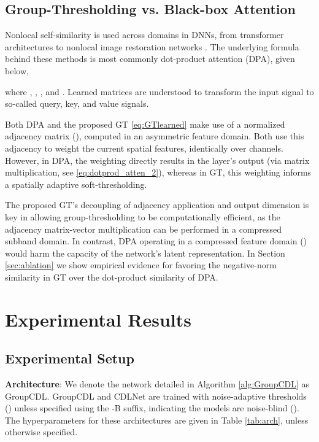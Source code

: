 \documentclass[lettersize,journal]{IEEEtran}
\begin{document}
\subsection{Group-Thresholding vs. Black-box Attention}
Nonlocal self-similarity is used across domains in DNNs, from transformer
architectures \cite{dao2022flashattention} to nonlocal image restoration networks
\cite{liu2018non, zhang2019residual}. The underlying formula behind these methods is most commonly dot-product attention (DPA), given below,

where , ,
, and . 
Learned matrices  are understood to transform the input signal
 to so-called query, key, and value signals. 

Both DPA and the proposed GT \eqref{eq:GTlearned} make use of a normalized adjacency matrix
(), computed in an asymmetric feature domain. Both use this adjacency
to weight the current spatial features, identically over channels. However, in
DPA, the weighting directly results in the layer's output (via matrix
multiplication, see \eqref{eq:dotprod_atten_2}), whereas in GT, this weighting informs a spatially adaptive
soft-thresholding. 

The proposed GT's decoupling of adjacency application and output dimension is key in allowing
group-thresholding to be computationally efficient, as the adjacency
matrix-vector multiplication can be performed in a compressed subband domain. In contrast,
DPA operating in a compressed feature domain () would harm the
capacity of the network's latent representation. In Section
\ref{sec:ablation} we show empirical evidence for favoring the negative-norm
similarity in GT over the dot-product similarity of DPA.

\section{Experimental Results} \label{sec:results}
\subsection{Experimental Setup}
\textbf{Architecture}: We denote the network detailed in Algorithm \ref{alg:GroupCDL} as
GroupCDL. GroupCDL and CDLNet are trained with noise-adaptive thresholds () unless specified using the
-B suffix, indicating the models are noise-blind (). The hyperparameters for these architectures are
given in Table \ref{tab:arch}, unless otherwise specified.
\end{document}
